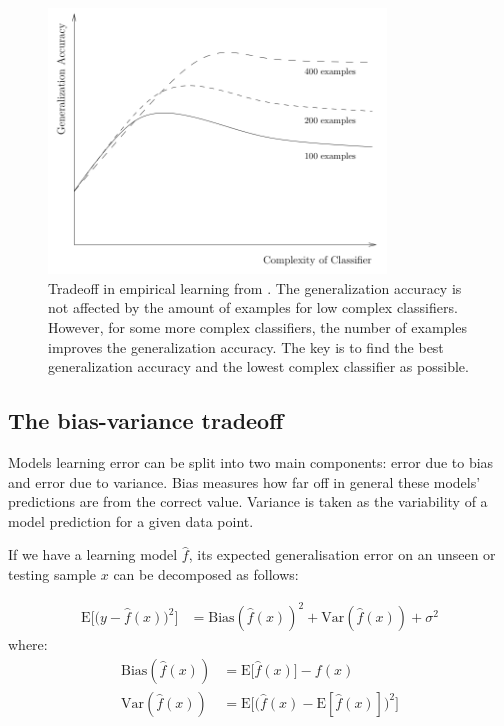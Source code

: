 \begin{figure}[!h]
  \centering
  \includegraphics[width=0.8\textwidth]{img/3tradeoff}
  \caption{Tradeoff in empirical learning from \cite{dietterich2003}. The generalization accuracy is not affected by the amount of examples for low complex classifiers. However, for some more complex classifiers, the number of examples improves the generalization accuracy. The key is to find the best generalization accuracy and the lowest complex classifier as possible. }
  \label{fig:tradeoff}
\end{figure}

\subsection{The bias-variance tradeoff} \label{sec:biasvar}

Models learning error can be split into two main components: error due to bias and error due to variance. Bias measures how far off in general these models' predictions are from the correct value. Variance is taken as the variability of a model prediction for a given data point.

If we have a learning model $\hat{f}$, its expected generalisation error on an unseen or testing sample $x$ can be decomposed as follows:

\begin{align}
\label{eq:bvtrade}
\mathrm{E}\Big[\big(y - \hat{f}(x)\big)^2\Big]
 & = \mathrm{Bias}(\hat{f}(x))^2 + \mathrm{Var}(\hat{f}(x)) + \sigma^2
\end{align}
\noindent where:
\begin{align*}
 \mathrm{Bias}(\hat{f}(x)) &= \mathrm{E}\big[\hat{f}(x)\big] - f(x) \\
 \mathrm{Var}(\hat{f}(x)) &= \mathrm{E}\Big[ \big( \hat{f}(x) - \mathrm{E}[\hat{f}(x)] \big)^2 \Big] 
\end{align*}


